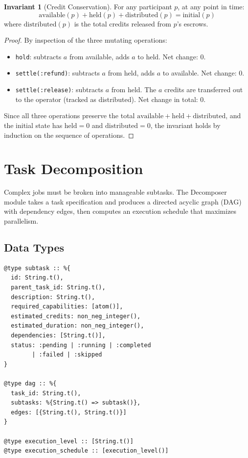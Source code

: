 \documentclass[12pt,a4paper]{article}
\theoremstyle{plain}
\theoremstyle{definition}
\newtheorem{invariant}[theorem]{Invariant}
\begin{document}
\begin{invariant}[Credit Conservation]\label{inv:conservation}
For any participant $p$, at any point in time:
\[
    \text{available}(p) + \text{held}(p) + \text{distributed}(p) = \text{initial}(p)
\]
where $\text{distributed}(p)$ is the total credits released from $p$'s escrows.
\end{invariant}

\begin{proof}
By inspection of the three mutating operations:
\begin{itemize}
    \item \texttt{hold}: subtracts $a$ from available, adds $a$ to held. Net change: 0.
    \item \texttt{settle(:refund)}: subtracts $a$ from held, adds $a$ to available. Net change: 0.
    \item \texttt{settle(:release)}: subtracts $a$ from held. The $a$ credits are transferred out to the operator (tracked as distributed). Net change in total: 0.
\end{itemize}
Since all three operations preserve the total $\text{available} + \text{held} + \text{distributed}$, and the initial state has $\text{held} = 0$ and $\text{distributed} = 0$, the invariant holds by induction on the sequence of operations.
\end{proof}

\section{Task Decomposition}\label{sec:decomposition}

Complex jobs must be broken into manageable subtasks. The Decomposer module takes a task specification and produces a directed acyclic graph (DAG) with dependency edges, then computes an execution schedule that maximizes parallelism.

\subsection{Data Types}

\begin{lstlisting}[caption={Decomposer types},label={lst:decomp-types}]
@type subtask :: %{
  id: String.t(),
  parent_task_id: String.t(),
  description: String.t(),
  required_capabilities: [atom()],
  estimated_credits: non_neg_integer(),
  estimated_duration: non_neg_integer(),
  dependencies: [String.t()],
  status: :pending | :running | :completed
        | :failed | :skipped
}

@type dag :: %{
  task_id: String.t(),
  subtasks: %{String.t() => subtask()},
  edges: [{String.t(), String.t()}]
}

@type execution_level :: [String.t()]
@type execution_schedule :: [execution_level()]
\end{lstlisting}
\end{document}
